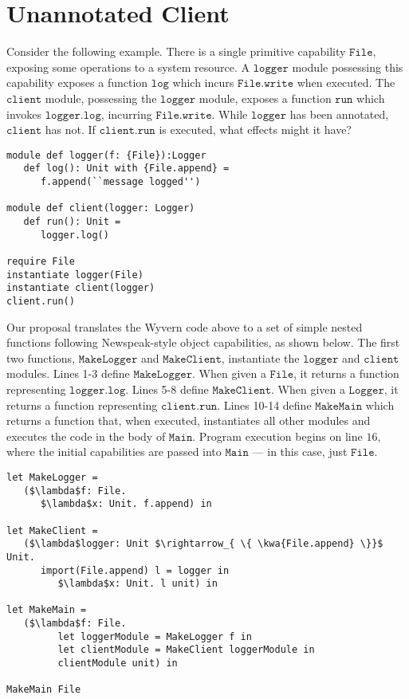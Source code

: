 \documentclass[sigplan,10pt,review]{acmart}\settopmatter{printfolios=true,printccs=false,printacmref=false}
\newcommand{\kwa}[1]{\mathtt{#1}}
\begin{document}
\section{Unannotated Client}

Consider the following example. There is a single primitive capability $\kwa{File}$, exposing some operations to a system resource. A $\kwa{logger}$ module possessing this capability exposes a function $\kwa{log}$ which incurs $\kwa{File.write}$ when executed. The $\kwa{client}$ module, possessing the $\kwa{logger}$ module, exposes a function $\kwa{run}$ which invokes $\kwa{logger.log}$, incurring $\kwa{File.write}$. While $\kwa{logger}$ has been annotated, $\kwa{client}$ has not. If $\kwa{client.run}$ is executed, what effects might it have?


\begin{lstlisting}
module def logger(f: {File}):Logger
   def log(): Unit with {File.append} =
      f.append(``message logged'')

module def client(logger: Logger)
   def run(): Unit =
      logger.log()

require File
instantiate logger(File)
instantiate client(logger)
client.run()
\end{lstlisting}

Our proposal translates the Wyvern code above to a set of simple nested functions following Newspeak-style object capabilities, as shown below. The first two functions, $\kwa{MakeLogger}$ and $\kwa{MakeClient}$, instantiate the $\kwa{logger}$ and $\kwa{client}$ modules. Lines 1-3 define $\kwa{MakeLogger}$. When given a $\kwa{File}$, it returns a function representing $\kwa{logger.log}$. Lines 5-8 define $\kwa{MakeClient}$. When given a $\kwa{Logger}$, it returns a function representing $\kwa{client.run}$. Lines 10-14 define $\kwa{MakeMain}$ which returns a function that, when executed, instantiates all other modules and executes the code in the body of $\kwa{Main}$. Program execution begins on line $16$, where the initial capabilities are passed into $\kwa{Main}$ --- in this case, just $\kwa{File}$.

\begin{lstlisting}
let MakeLogger =
   ($\lambda$f: File.
      $\lambda$x: Unit. f.append) in
          
let MakeClient =
   ($\lambda$logger: Unit $\rightarrow_{ \{ \kwa{File.append} \}}$ Unit.
      import(File.append) l = logger in
         $\lambda$x: Unit. l unit) in
          
let MakeMain =
   ($\lambda$f: File.
         let loggerModule = MakeLogger f in
         let clientModule = MakeClient loggerModule in
         clientModule unit) in

MakeMain File
\end{lstlisting}
\end{document}

